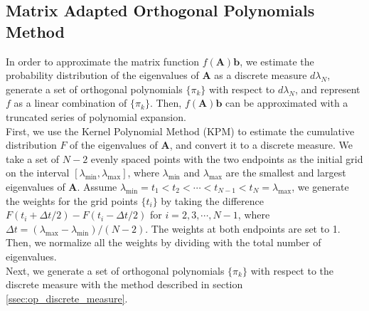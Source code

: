 \documentclass[11pt,letter]{article}
\begin{document}
\subsection{Matrix Adapted Orthogonal Polynomials Method}
In order to approximate the matrix function $f(\mathbf{A})\mathbf{b}$, we estimate the probability distribution of the eigenvalues of $\mathbf{A}$ as a discrete measure $d\lambda_N$, generate a set of orthogonal polynomials $\{\pi_k\}$ with respect to $d\lambda_N$, and represent $f$ as a linear combination of $\{\pi_k\}$. Then, $f(\mathbf{A})\mathbf{b}$ can be approximated with a truncated series of polynomial expansion.\\

First, we use the Kernel Polynomial Method (KPM) to estimate the cumulative distribution $F$ of the eigenvalues of $\mathbf{A}$, and convert it to a discrete measure. We take a set of $N-2$ evenly spaced points with the two endpoints as the initial grid on the interval $[\lambda_{\min},\lambda_{\max}]$, where $\lambda_{\min}$ and $\lambda_{\max}$ are the smallest and largest eigenvalues of $\mathbf{A}$. Assume $\lambda_{\min}=t_1<t_2<\cdots<t_{N-1}<t_N=\lambda_{\max}$, we generate the weights for the grid points $\{t_i\}$ by taking the difference $F(t_i+\Delta t/2)-F(t_i-\Delta t/2)$ for $i=2,3,\cdots,N-1$, where $\Delta t= (\lambda_{\max}-\lambda_{\min})/(N-2)$. The weights at both endpoints are set to 1. Then, we normalize all the weights by dividing with the total number of eigenvalues.\\

Next, we generate a set of orthogonal polynomials $\{\pi_k\}$ with respect to the discrete measure with the method described in section \ref{ssec:op_discrete_measure}.\\
\end{document}
